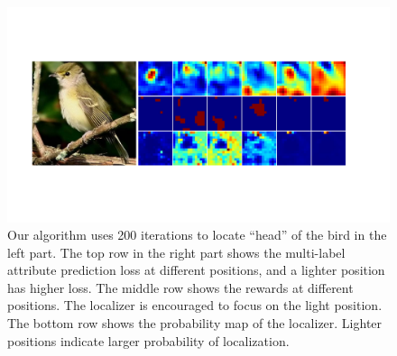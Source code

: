 \documentclass{article}
\begin{document}
\begin{figure}[!t]
\begin{center}
\includegraphics[scale = 0.4]{3.pdf}
\end{center}
\caption{Our algorithm uses 200 iterations to locate ``head'' of the bird in the left part.
 The top row in the right part shows the multi-label attribute prediction loss at different positions,
and a lighter position has higher loss.
The middle row shows the rewards at different positions. The localizer is encouraged to focus on the light position.
The bottom row shows the probability map of the localizer. Lighter positions indicate larger probability of localization.
}\label{fig:fig4}
\end{figure}


\end{document}
